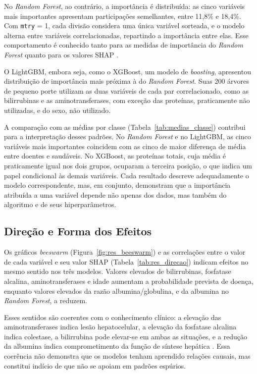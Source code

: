 No \textit{Random Forest}, ao contrário, a importância é distribuída: as cinco variáveis mais importantes apresentam participações semelhantes, entre 11,8\% e 18,4\%. Com \texttt{mtry} = 1, cada divisão considera uma única variável sorteada, e o modelo alterna entre variáveis correlacionadas, repartindo a importância entre elas. Esse comportamento é conhecido tanto para as medidas de importância do \textit{Random Forest} \cite{Strobl2008Conditional} quanto para os valores SHAP \cite{Aas2021Explaining}.

O LightGBM, embora seja, como o XGBoost, um modelo de \textit{boosting}, apresentou distribuição de importância mais próxima à do \textit{Random Forest}. Suas 200 árvores de pequeno porte utilizam as duas variáveis de cada par correlacionado, como as bilirrubinas e as aminotransferases, com exceção das proteínas, praticamente não utilizadas, e do sexo, não utilizado.

A comparação com as médias por classe (Tabela~\ref{tab:medias_classe}) contribui para a interpretação desses padrões. No \textit{Random Forest} e no LightGBM, as cinco variáveis mais importantes coincidem com as cinco de maior diferença de média entre doentes e saudáveis. No XGBoost, as proteínas totais, cuja média é praticamente igual nos dois grupos, ocuparam a terceira posição, o que indica um papel condicional às demais variáveis. Cada resultado descreve adequadamente o modelo correspondente, mas, em conjunto, demonstram que a importância atribuída a uma variável depende não apenas dos dados, mas também do algoritmo e de seus hiperparâmetros.

\subsection{Direção e Forma dos Efeitos}
\label{sec:res_shap_direcao}

Os gráficos \textit{beeswarm} (Figura~\ref{fig:res_beeswarm}) e as correlações entre o valor de cada variável e seu valor SHAP (Tabela~\ref{tab:res_direcao}) indicam efeitos no mesmo sentido nos três modelos. Valores elevados de bilirrubinas, fosfatase alcalina, aminotransferases e idade aumentam a probabilidade prevista de doença, enquanto valores elevados da razão albumina/globulina, e da albumina no \textit{Random Forest}, a reduzem.

Esses sentidos são coerentes com o conhecimento clínico: a elevação das aminotransferases indica lesão hepatocelular, a elevação da fosfatase alcalina indica colestase, a bilirrubina pode elevar-se em ambas as situações, e a redução da albumina indica comprometimento da função de síntese hepática \cite{Kwo2016ACG, Trebicka2025Controversies}. Essa coerência não demonstra que os modelos tenham aprendido relações causais, mas constitui indício de que não se apoiam em padrões espúrios.

